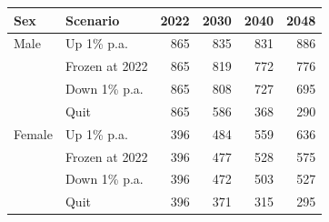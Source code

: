 \begingroup
\renewcommand{\arraystretch}{1.08}
\setlength{\tabcolsep}{4pt}
\begin{tabular}{llrrrr}
\toprule
Sex & Scenario & 2022 & 2030 & 2040 & 2048 \\
\midrule
Male & Up 1\% p.a. & 865 & 835 & 831 & 886 \\
 & Frozen at 2022 & 865 & 819 & 772 & 776 \\
 & Down 1\% p.a. & 865 & 808 & 727 & 695 \\
 & Quit & 865 & 586 & 368 & 290 \\
\midrule
Female & Up 1\% p.a. & 396 & 484 & 559 & 636 \\
 & Frozen at 2022 & 396 & 477 & 528 & 575 \\
 & Down 1\% p.a. & 396 & 472 & 503 & 527 \\
 & Quit & 396 & 371 & 315 & 295 \\
\bottomrule
\end{tabular}
\endgroup
